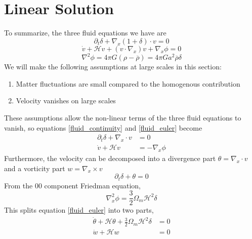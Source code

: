 \section{Linear Solution}
To summarize, the three fluid equations we have are
\begin{equation}\label{fluid_continuity}
	\partial_t \delta + \nabla_x (1+\delta) \cdot v =0
\end{equation}
\begin{equation}\label{fluid_euler}
	\dot v + \mathcal{H} v + (v\cdot\nabla_x) v + \nabla_x\phi = 0
\end{equation}
\begin{equation}\label{fluid_poisson}
	\nabla^2\phi = 4\pi G (\rho-\overline{\rho}) = 4\pi G a^2 \overline{\rho} \delta
\end{equation}
We will make the following assumptions at large scales in this section:
\begin{enumerate}
	\item Matter fluctuations are small compared to the homogenous contribution 
	\item Velocity vanishes on large scales
\end{enumerate}
These assumptions allow the non-linear terms of the three fluid equations to vanish, so equations \ref{fluid_continuity} and \ref{fluid_euler} become
\begin{equation}
	\begin{split}
		\partial_t\delta + \nabla_x \cdot v &= 0 \\
		\dot v + \mathcal{H}v &= -\nabla_x\phi
	\end{split}
\end{equation}
Furthermore, the velocity can be decomposed into a divergence part $\theta = \nabla_x \cdot v $ and a vorticity part $w = \nabla_x \times v$
\begin{equation}\label{delta_theta}
	\partial_t\delta + \theta = 0
\end{equation}
From the $00$ component Friedman equation,
\begin{equation}
	\nabla_x^2\phi = \frac{3}{2}\Omega_m \mathcal{H}^2\delta
\end{equation}
This splits equation \ref{fluid_euler} into two parts,
\begin{equation}
	\begin{split}\label{fluid_euler_div}
		\dot \theta + \mathcal{H}\theta + \frac{3}{2}\Omega_m \mathcal{H}^2\delta &= 0 \\
		\dot w + \mathcal{H}w &= 0
	\end{split}
\end{equation}
